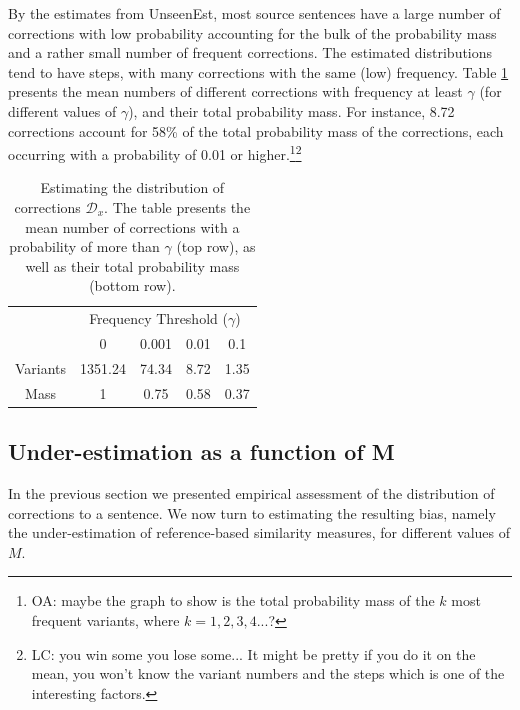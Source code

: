 \documentclass[letter,11pt]{article}
\newcommand{\oa}[1]{\footnote{\color{red}OA: #1}}
\newcommand{\lc}[1]{\footnote{\color{green}LC: #1}}
\begin{document}
By the estimates from {\sc UnseenEst}, most source sentences have a large number of
corrections with low probability accounting for the bulk of the probability mass
and a rather small number of frequent corrections.
The estimated distributions tend to have steps, with many corrections with the same (low) frequency.
Table \ref{tab:corrections_dist} presents the mean numbers of different corrections with frequency at least
$\gamma$ (for different values of $\gamma$), and their total probability mass.
For instance, 8.72 corrections account for 58\% of the total probability mass of the corrections, each
occurring with a probability of 0.01 or higher.\oa{maybe the graph to show is the total probability mass
  of the $k$ most frequent variants, where $k=1,2,3,4...$?  }\lc{you win some you lose some... It might be pretty if you do it on the mean, you won't know the variant numbers and the steps which is one of the interesting factors.}

\begin{table}[h!]
  \centering
  \small
  \singlespacing
  \begin{tabular}{c|c|c|c|c|}
    & \multicolumn{4}{c|}{Frequency Threshold ($\gamma$)}\\ 
    & \multicolumn{1}{c}{0} & \multicolumn{1}{c}{0.001} & \multicolumn{1}{c}{0.01} & \multicolumn{1}{c|}{0.1}
    \\
    \hline
    Variants & 1351.24 & 74.34 & 8.72 & 1.35
    \\
    Mass & 1 & 0.75 & 0.58 & 0.37\\
    \hline
  \end{tabular}
  \caption{\label{tab:corrections_dist}
    Estimating the distribution of corrections $\mathcal{D}_x$.
    The table presents the mean number of corrections with a probability of more than
    $\gamma$ (top row), as well as their total probability mass (bottom row).
  }
\end{table}


\subsection{Under-estimation as a function of M} \label{subsec:Assessment-values}

In the previous section we presented empirical assessment of the distribution of
corrections to a sentence. We now turn to estimating the resulting bias, namely
the under-estimation of reference-based similarity measures, for different values of $M$.
\end{document}
